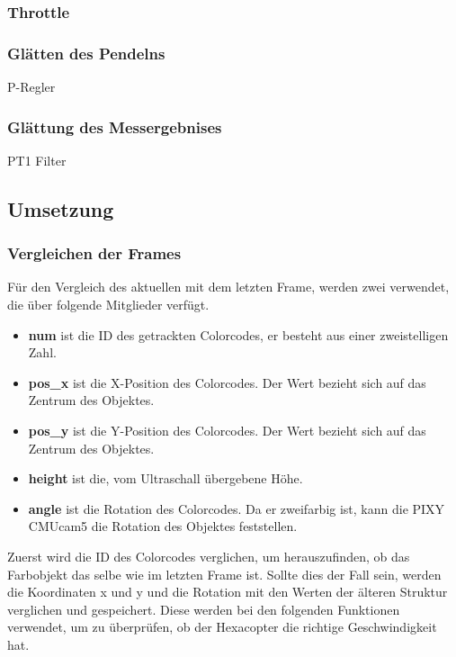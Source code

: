
    \subsubsection{Throttle}

    \subsubsection{Glätten des Pendelns}

    P-Regler

    \subsubsection{Glättung des Messergebnises}
    
    PT1 Filter


  \subsection{Umsetzung}

    \subsubsection{Vergleichen der Frames}
    Für den Vergleich des aktuellen mit dem letzten Frame, werden zwei  verwendet, die über folgende Mitglieder verfügt. \cite{Structs}
    \begin{itemize}
      \item \textbf{num} ist die ID des getrackten Colorcodes, er besteht aus einer zweistelligen Zahl.
      \item \textbf{pos\_x} ist die X-Position des Colorcodes. Der Wert bezieht sich auf das Zentrum des Objektes.
      \item \textbf{pos\_y} ist die Y-Position des Colorcodes. Der Wert bezieht sich auf das Zentrum des Objektes.
      \item \textbf{height} ist die, vom Ultraschall übergebene Höhe.
      \item \textbf{angle} ist die Rotation des Colorcodes. Da er zweifarbig ist, kann die PIXY CMUcam5 die Rotation des Objektes feststellen.
    \end{itemize}

    Zuerst wird die ID des Colorcodes verglichen, um herauszufinden, ob das Farbobjekt das selbe wie im letzten Frame ist.
    Sollte dies der Fall sein, werden die Koordinaten x und y und die Rotation mit den Werten der älteren Struktur verglichen und gespeichert.
    Diese werden bei den folgenden Funktionen verwendet, um zu überprüfen, ob der Hexacopter die richtige Geschwindigkeit hat.

